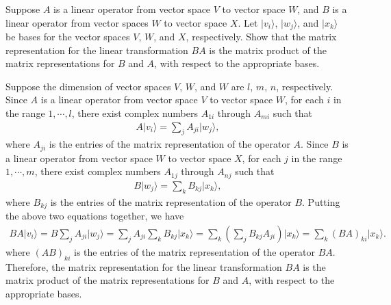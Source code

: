 \documentclass[en]{sol-man}
\begin{document}
\begin{exe}
    Suppose $A$ is a linear operator from vector space $V$ to vector space $W$, and $B$ is a linear operator from vector spaces $W$ to vector space $X$. Let $\lvert v_i\rangle$, $\lvert w_j\rangle$, and $\lvert x_k\rangle$ be bases for the vector spaces $V$, $W$, and $X$, respectively. Show that the matrix representation for the linear transformation $BA$ is the matrix product of the matrix representations for $B$ and $A$, with respect to the appropriate bases.
\end{exe}
\begin{sol}
    Suppose the dimension of vector spaces $V$, $W$, and $W$ are $l$, $m$, $n$, respectively. Since $A$ is a linear operator from vector space $V$ to vector space $W$, for each $i$ in the range $1,\cdots,l$, there exist complex numbers $A_{1i}$ through $A_{mi}$ such that
    \begin{align}
        A\lvert v_i\rangle=\sum_jA_{ji}\lvert w_j\rangle,
    \end{align}
    where $A_{ji}$ is the entries of the matrix representation of the operator $A$.
    Since $B$ is a linear operator from vector space $W$ to vector space $X$, for each $j$ in the range $1,\cdots,m$, there exist complex numbers $A_{1j}$ through $A_{nj}$ such that
    \begin{align}
        B\lvert w_j\rangle=\sum_kB_{kj}\lvert x_k\rangle,
    \end{align}
    where $B_{kj}$ is the entries of the matrix representation of the operator $B$.
    Putting the above two equations together, we have
    \begin{align}
        BA\lvert v_i\rangle=B\sum_jA_{ji}\lvert w_j\rangle=\sum_jA_{ji}\sum_kB_{kj}\lvert x_k\rangle=\sum_k\left(\sum_jB_{kj}A_{ji}\right)\lvert x_k\rangle=\sum_k(BA)_{ki}\lvert x_k\rangle.
    \end{align}
    where $(AB)_{ki}$ is the entries of the matrix representation of the operator $BA$. Therefore, the matrix representation for the linear transformation $BA$ is the matrix product of the matrix representations for $B$ and $A$, with respect to the appropriate bases.
\end{sol}
\end{document}
